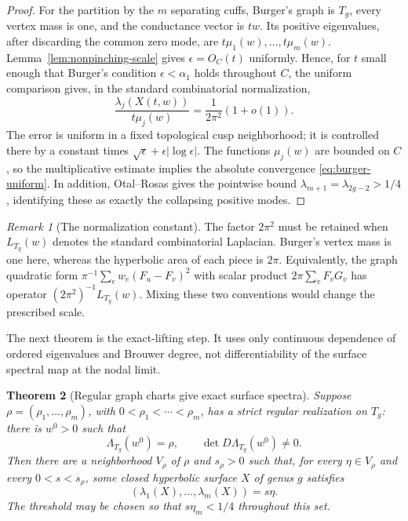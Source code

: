 \documentclass[11pt,reqno]{amsart}
\newtheorem{theorem}{Theorem}[section]
\theoremstyle{definition}
\theoremstyle{remark}
\newtheorem{remark}[theorem]{Remark}
\begin{document}
\begin{proof}
For the partition by the $m$ separating cuffs, Burger's graph is $T_g$,
every vertex mass is one, and the conductance vector is $tw$.  Its positive
eigenvalues, after discarding the common zero mode, are
$t\mu_1(w),\ldots,t\mu_m(w)$.  Lemma~\ref{lem:nonpinching-scale} gives
$\epsilon=O_C(t)$ uniformly.  Hence, for $t$ small enough that Burger's
condition $\epsilon<\alpha_1$ holds throughout $C$, the uniform comparison
\cite[Theorem~1.1]{Burger1990} gives, in the standard combinatorial
normalization,
\[
 \frac{\lambda_j(X(t,w))}{t\mu_j(w)}
 =\frac1{2\pi^2}(1+o(1)).
\]
The error is uniform in a fixed topological cusp neighborhood; it is
controlled there by a constant times
$\sqrt\epsilon+\epsilon|\log\epsilon|$.  The functions $\mu_j(w)$ are
bounded on $C$, so the multiplicative estimate implies the absolute
convergence \eqref{eq:burger-uniform}.  In addition, Otal--Rosas gives the
pointwise bound $\lambda_{m+1}=\lambda_{2g-2}>1/4$, identifying these as
exactly the collapsing positive modes.
\end{proof}

\begin{remark}[The normalization constant]\label{rem:normalization}
The factor $2\pi^2$ must be retained when $L_{T_g}(w)$ denotes the standard
combinatorial Laplacian.  Burger's vertex mass is one here, whereas the
hyperbolic area of each piece is $2\pi$.  Equivalently, the graph quadratic
form $\pi^{-1}\sum_e w_e(F_u-F_v)^2$ with scalar product
$2\pi\sum_vF_vG_v$ has operator $(2\pi^2)^{-1}L_{T_g}(w)$.  Mixing these two
conventions would change the prescribed scale.
\end{remark}

The next theorem is the exact-lifting step.  It uses only continuous
dependence of ordered eigenvalues and Brouwer degree, not differentiability
of the surface spectral map at the nodal limit.

\begin{theorem}[Regular graph charts give exact surface spectra]
\label{thm:surface-transfer}
Suppose $\rho=(\rho_1,\ldots,\rho_m)$, with
$0<\rho_1<\cdots<\rho_m$, has a strict regular realization on $T_g$:
there is $w^0>0$ such that
\[
 \Lambda_{T_g}(w^0)=\rho,
 \qquad \det D\Lambda_{T_g}(w^0)\ne0.
\]
Then there are a neighborhood $V_\rho$ of $\rho$ and $s_\rho>0$ such that,
for every $\eta\in V_\rho$ and every $0<s<s_\rho$, some closed hyperbolic
surface $X$ of genus $g$ satisfies
\begin{equation}\label{eq:exact-surface}
 (\lambda_1(X),\ldots,\lambda_m(X))=s\eta.
\end{equation}
The threshold may be chosen so that $s\eta_m<1/4$ throughout this set.
\end{theorem}
\end{document}
